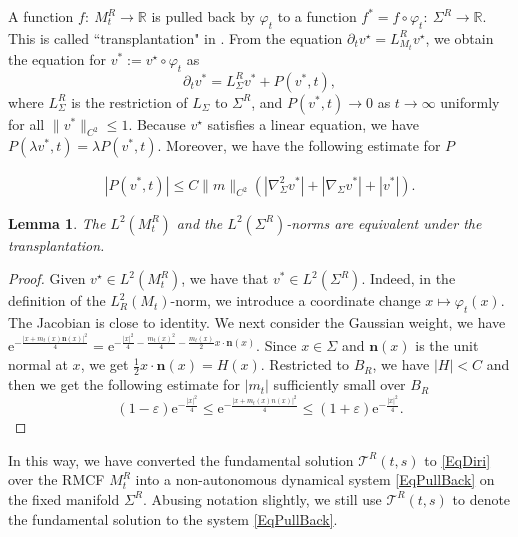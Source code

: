 \documentclass[12pt]{amsart}
\numberwithin{equation}{section}
\newtheorem{lemma}[theorem]{Lemma}
\numberwithin{equation}{section}
\newcommand{\eps}{\varepsilon}
\newcommand{\bn}{\mathbf{n}}
\newcommand{\R}{\mathbb{R}}
\begin{document}
	A function $f:\ M_t^R\to \R$ is pulled back by $\varphi_t$ to a function $f^*=f\circ \varphi_t:\ \Sigma^R\to \R$. This is called ``transplantation" in \cite{SX}.
	From the equation $\partial_tv^\star=L^R_{M_t} v^\star$, we obtain the equation for $v^*:=v^\star\circ\varphi_t$ as 
	\begin{equation}\label{EqPullBack}
		\partial_t v^*=L^R_\Sigma v^*+P(v^*,t),
	\end{equation}
	where $L^R_\Sigma$ is the restriction of $L_\Sigma$ to $\Sigma^R$, and $P(v^*,t)\to 0$ as $t\to\infty$ uniformly for all $\|v^*\|_{C^2}\leq 1$. Because $v^\star$ satisfies a linear equation, we have $P(\lambda v^*, t)=\lambda P(v^*,t)$. Moreover, we have the following estimate for $P$ 
	
	\begin{equation}\label{EqP}
		\begin{aligned}
			|P(v^*,t)|
			\leq C\|m\|_{C^2}(|\nabla^2_\Sigma v^*|+|\nabla_\Sigma v^*|+|v^*|).
		\end{aligned}
	\end{equation}
	\begin{lemma}
		The $L^2(M_t^R)$ and the $L^2(\Sigma^R)$-norms are equivalent under the transplantation.
	\end{lemma}
	\begin{proof}
		
		Given $v^\star\in L^2(M^R_t)$, we have that $v^*\in L^2(\Sigma^R)$. Indeed, in the definition of the $L^2_R(M_t)$-norm, we introduce a coordinate change $x\mapsto \varphi_t(x)$. The Jacobian is close to identity. We next consider the Gaussian weight, we have $\mathrm{e}^{-\frac{|x+m_t(x)\bn(x)|^2}{4}}=\mathrm{e}^{-\frac{|x|^2}{4}-\frac{m_t(x)^2}{4}-\frac{m_t(x)}{2} x\cdot \bn(x)}.$
		Since $x\in \Sigma$ and $\bn(x)$ is the unit normal at $x$, we get $\frac12x\cdot \bn(x)=H(x)$.
		Restricted to $B_R$, we have $|H|<C$ and then we get the following estimate for $|m_t|$ sufficiently small over $B_R$ $$(1-\eps )\mathrm{e}^{-\frac{|x|^2}{4}}\leq \mathrm{e}^{-\frac{|x+m_t(x)n(x)|^2}{4}}\leq (1+\eps) \mathrm{e}^{-\frac{|x|^2}{4}}. $$
	\end{proof} 
	
	In this way, we have converted the fundamental solution $\mathcal T^R(t,s)$ to \eqref{EqDiri} over the RMCF $M_t^R$ into a non-autonomous dynamical system \eqref{EqPullBack} on the fixed manifold $\Sigma^R$.  Abusing notation slightly, we still use $\mathcal T^R(t,s)$ to denote the fundamental solution to the system \eqref{EqPullBack}. 
	
\end{document}
